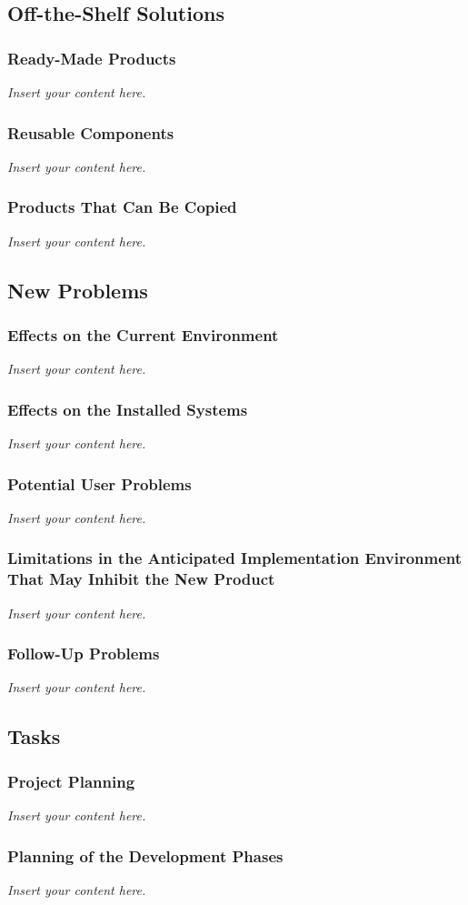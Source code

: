 \documentclass[12pt]{article}
\newcommand{\lips}{\textit{Insert your content here.}}
\begin{document}
\subsection{Off-the-Shelf Solutions}
\subsubsection{Ready-Made Products}
\lips
\subsubsection{Reusable Components}
\lips
\subsubsection{Products That Can Be Copied}
\lips

\subsection{New Problems}
\subsubsection{Effects on the Current Environment}
\lips
\subsubsection{Effects on the Installed Systems}
\lips
\subsubsection{Potential User Problems}
\lips
\subsubsection{Limitations in the Anticipated Implementation Environment That May
Inhibit the New Product}
\lips
\subsubsection{Follow-Up Problems}
\lips

\subsection{Tasks}
\subsubsection{Project Planning}
\lips
\subsubsection{Planning of the Development Phases}
\lips
\end{document}
